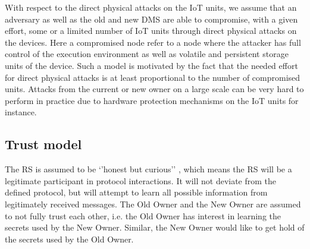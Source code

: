 {With respect to the direct physical attacks on the IoT units, we assume that an adversary as well as the old and new DMS are able to compromise, with a given effort, some or a limited number of IoT units through direct physical attacks on the devices. Here a compromised node refer to a node where the attacker has full control of the execution environment as well as volatile and persistent storage units of the device. Such a model is motivated by the fact that the needed effort for direct physical attacks is at least proportional to the number of compromised units.  Attacks from the current or new owner on a large scale can be very hard to perform in practice due to hardware protection mechanisms on the IoT units for instance.
\subsection{Trust model}
 The RS is assumed to be ‘’honest but curious’’ \cite{Oded2009}, which means the RS will be a legitimate  participant in protocol interactions. It will not deviate from the defined protocol, but will attempt to learn all possible information from legitimately received messages. The Old Owner and the New Owner are assumed to not fully trust each other, i.e. the Old Owner has interest in learning the secrets used by the New Owner. Similar, the New Owner would like to get hold of the secrets used by the Old Owner.

}
